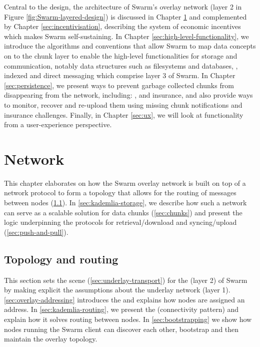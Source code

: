 Central to the design, the architecture of Swarm's overlay network (layer 2 in Figure \ref{fig:Swarm-layered-design}) is discussed in Chapter \ref{sec:network} and complemented by Chapter \ref{sec:incentivisation}, describing the system of economic incentives which makes Swarm self-sustaining. In Chapter \ref{sec:high-level-functionality}, we introduce the algorithms and conventions that allow Swarm to map data concepts on to the chunk layer to enable the high-level functionalities for storage and communication, notably data structures such as filesystems and databases, , indexed  and direct messaging  which comprise layer 3 of Swarm.
In Chapter \ref{sec:persistence}, we present ways to prevent garbage collected chunks from disappearing from the network, including: ,  and insurance, and also provide ways to monitor, recover and re-upload them using missing chunk notifications and insurance challenges. 
Finally, in Chapter \ref{sec:ux}, we will look at functionality from a user-experience perspective.

\chapter{Network}\label{sec:network}

This chapter elaborates on how the Swarm overlay network is built on top of a  network protocol to form a topology that allows for the routing of messages between nodes (\ref{sec:topology-routing}). In \ref{sec:kademlia-storage}, we describe how such a network can serve as a scalable  solution for data chunks (\ref{sec:chunks}) and present the logic underpinning the protocols for retrieval/download and syncing/upload (\ref{sec:push-and-pull}).

\section{Topology and routing \statusgreen}\label{sec:topology-routing}

This section sets the scene (\ref{sec:underlay-transport}) for the  (layer 2) of Swarm by making explicit the assumptions about the underlay network (layer 1). \ref{sec:overlay-addressing} introduces the  and explains how nodes are assigned an address. In  \ref{sec:kademlia-routing}, we present the   (connectivity pattern) and explain how it solves routing between nodes. In \ref{sec:bootstrapping} we show how nodes running the Swarm client can discover each other, bootstrap and then maintain the overlay topology.

